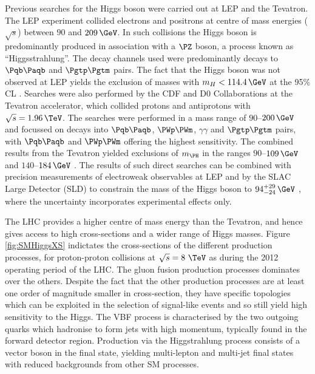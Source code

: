 Previous searches for the Higgs boson were carried out at LEP and the
Tevatron. The LEP experiment collided electrons and positrons at centre of mass
energies ($\sqrt{s}$) between $90$ and $209\,\GeV$. In such collisions the Higgs
boson is predominantly produced in association with a $\PZ$ boson, a process
known as ``Higgsstrahlung''. The decay channels used were predominantly decays
to $\Pqb\Paqb$ and $\Pgtp\Pgtm$ pairs. The fact that the Higgs boson was not
observed at LEP yields the exclusion of masses with $m_{H}<114.4\,\GeV$ at the
95\% \ac{CL} \cite{Barate:2003sz}. Searches were also performed by the CDF and D0 Collaborations at
the Tevatron accelerator, which collided protons and antiprotons with
$\sqrt{s}=1.96\,\TeV$. The searches were performed in a mass range of
$90$--$200\,\GeV$ and focussed on decays into $\Pqb\Paqb$, $\PWp\PWm$,
$\gamma\gamma$ and $\Pgtp\Pgtm$ pairs, with  $\Pqb\Paqb$ and $\PWp\PWm$ offering
the highest sensitivity. The combined results from the Tevatron yielded
exclusions of $m_{\PH}$ in the ranges $90$--$109\,\GeV$ and $140$--$184\,\GeV$
\cite{Aaltonen:2013kxa}. The results of such direct searches
can be combined with precision measurements of electroweak observables at LEP
and by the SLAC Large Detector (SLD) to constrain the mass of the Higgs
boson to $94^{+29}_{-24}\,\GeV$ \cite{lepewwg}, 
where the uncertainty incorporates experimental effects only.

The LHC provides a higher centre of mass energy than the Tevatron, and hence
gives access to high cross-sections and a wider range of Higgs masses. Figure
\ref{fig:SMHiggsXS} indictates the cross-sections of the different production
processes, for proton-proton collisions at $\sqrt{s}=8~\TeV$ as during the 
2012 operating period of the LHC. The gluon fusion production processes dominates 
over the others. Despite the
fact that the other production processes are at least one order of magnitude smaller in
cross-section, they have specific topologies which can be exploited 
in the selection of signal-like events and so still yield high sensitivity to the
Higgs. The \ac{VBF} process is characterised by the two outgoing quarks which
hadronise to form jets with high momentum, typically found in the forward
detector region. Production via the Higgstrahlung process consists of a vector
boson in the final state, yielding multi-lepton and multi-jet final states with
reduced backgrounds from other \ac{SM} processes.

